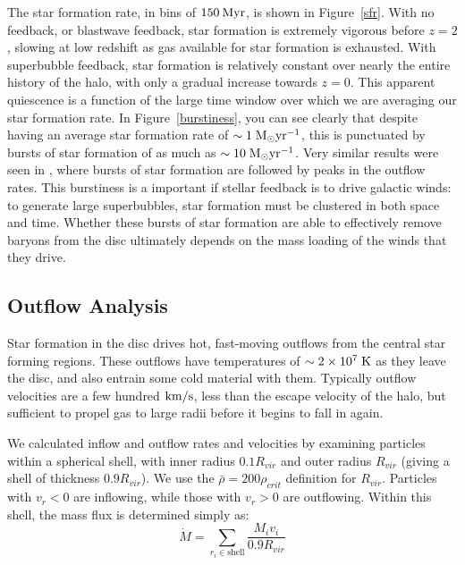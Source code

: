 The star formation rate, in bins of $150\: \rm{Myr}$, is shown in
Figure~\ref{sfr}.  With no feedback, or blastwave feedback, star formation is
extremely vigorous before $z=2$, slowing at low redshift as gas available for
star formation is exhausted.  With superbubble feedback, star formation is
relatively constant over nearly the entire history of the halo, with only a
gradual increase towards $z=0$.  This apparent quiescence is a function of the
large time window over which we are averaging our star formation rate.  In
Figure~\ref{burstiness}, you can see clearly that despite having an average star
formation rate of $\sim1\; \rm{M_\odot yr^{-1}}$, this is punctuated by bursts
of star formation of as much as $\sim10\; \rm{M_\odot yr^{-1}}$.  Very similar
results were seen in \citet{Muratov2015}, where bursts of star formation are
followed by peaks in the outflow rates.  This burstiness is a important if
stellar feedback is to drive galactic winds:  to generate large superbubbles,
star formation must be clustered in both space and time.  Whether these bursts
of star formation are able to effectively remove baryons from the disc
ultimately depends on the mass loading of the winds that they drive.

\subsection{Outflow Analysis}
Star formation in the disc drives hot, fast-moving outflows from the central star
forming regions.  These outflows have temperatures of $\sim2\times10^7\; \rm{K}$
as they leave the disc, and also entrain some cold material with them.
Typically outflow velocities are a few hundred $\rm{km/s}$, less than the
escape velocity of the halo, but sufficient to propel gas to large radii before
it begins to fall in again.  

We calculated inflow and outflow rates and velocities by examining particles
within a spherical shell, with inner radius $0.1R_{vir}$ and outer radius
$R_{vir}$ (giving a shell of thickness $0.9R_{vir}$).  We use the $\bar\rho =
200\rho_{crit}$ definition for $R_{vir}$.  Particles with $v_r < 0$ are
inflowing, while those with $v_r > 0$ are outflowing.
Within this shell, the mass flux is determined simply as:
\begin{equation}
    \dot M = \sum_{r_i\in\mathrm{shell}}\frac{M_i v_i}{0.9R_{vir}}
    \label{halo_massflux}
\end{equation}


